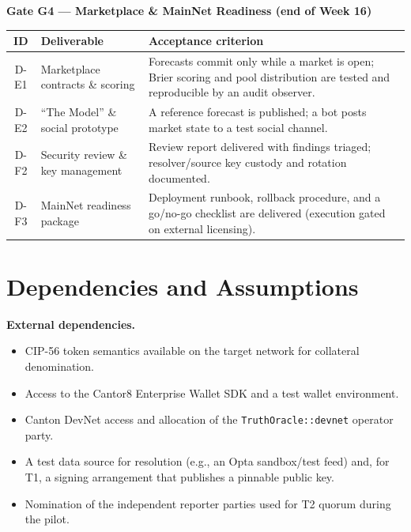 \documentclass[11pt,a4paper]{article}
\begin{document}
\noindent\textbf{Gate G4 --- Marketplace \& MainNet Readiness (end of Week 16)}
\begin{center}
\begin{tabularx}{\linewidth}{c R{4.2cm} Y}
\toprule
\textbf{ID} & \textbf{Deliverable} & \textbf{Acceptance criterion} \\
\midrule
D-E1 & Marketplace contracts \& scoring & Forecasts commit only while a market is open; Brier scoring and pool distribution are tested and reproducible by an audit observer. \\
D-E2 & ``The Model'' \& social prototype & A reference forecast is published; a bot posts market state to a test social channel. \\
D-F2 & Security review \& key management & Review report delivered with findings triaged; resolver/source key custody and rotation documented. \\
D-F3 & MainNet readiness package & Deployment runbook, rollback procedure, and a go/no-go checklist are delivered (execution gated on external licensing). \\
\bottomrule
\end{tabularx}
\end{center}

\section{Dependencies and Assumptions}

\textbf{External dependencies.}
\begin{itemize}[leftmargin=2em, itemsep=2pt]
\item CIP-56 token semantics available on the target network for collateral denomination.
\item Access to the Cantor8 Enterprise Wallet SDK and a test wallet environment.
\item Canton DevNet access and allocation of the \texttt{TruthOracle::devnet} operator party.
\item A test data source for resolution (e.g., an Opta sandbox/test feed) and, for T1, a signing arrangement that publishes a pinnable public key.
\item Nomination of the independent reporter parties used for T2 quorum during the pilot.
\end{itemize}
\end{document}

